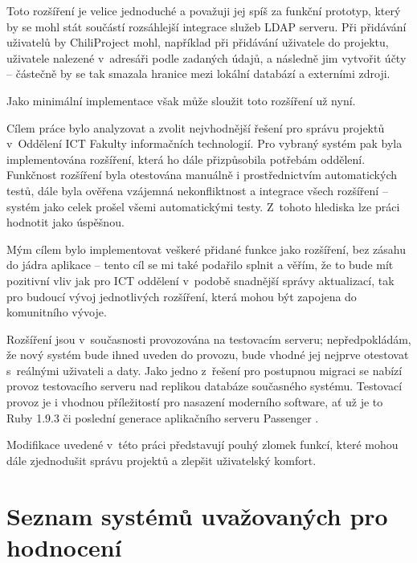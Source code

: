 \documentclass[thesis=B,czech]{FITthesis}[2012/05/02]
\begin{document}
Toto rozšíření je velice jednoduché a považuji jej spíš za funkční
prototyp, který by se mohl stát součástí rozsáhlejší integrace služeb
LDAP serveru. Při přidávání uživatelů by ChiliProject mohl, například
při přidávání uživatele do projektu,  uživatele nalezené
v~adresáři podle zadaných údajů, a následně jim vytvořit účty -- částečně
by se tak smazala hranice mezi lokální databází a externími zdroji.

Jako minimální implementace však může sloužit toto rozšíření už nyní.

\begin{conclusion}

Cílem práce bylo analyzovat a zvolit nejvhodnější řešení pro správu projektů v~Oddělení ICT Fakulty informačních technologií. Pro vybraný systém pak byla implementována rozšíření, která ho dále přizpůsobila potřebám oddělení. Funkčnost rozšíření byla otestována manuálně i prostřednictvím automatických testů, dále byla ověřena vzájemná nekonfliktnost a integrace všech rozšíření -- systém jako celek prošel všemi automatickými testy. Z~tohoto hlediska lze práci hodnotit jako úspěšnou.

Mým cílem bylo implementovat veškeré přidané funkce jako rozšíření, bez zásahu do jádra aplikace -- tento cíl se mi také podařilo splnit a věřím, že to bude mít pozitivní vliv jak pro ICT oddělení v~podobě snadnější správy aktualizací, tak pro budoucí vývoj jednotlivých rozšíření, která mohou být zapojena do komunitního vývoje.

Rozšíření jsou v~současnosti provozována na testovacím serveru; nepředpokládám, že nový systém bude ihned uveden do provozu, bude vhodné jej nejprve otestovat s~reálnými uživateli a daty. Jako jedno z~řešení pro postupnou migraci se nabízí provoz testovacího serveru nad replikou databáze současného systému. Testovací provoz je i vhodnou příležitostí pro nasazení moderního software, ať už je to Ruby 1.9.3 či poslední generace aplikačního serveru Passenger \citep{Passenger32}.

Modifikace uvedené v~této práci představují pouhý zlomek funkcí, které mohou dále zjednodušit správu projektů a zlepšit uživatelský komfort.

\end{conclusion}




\appendix

\glsaddall
\printglossaries

\chapter{Seznam systémů uvažovaných pro hodnocení}
\label{chap:seznampm}
\end{document}
